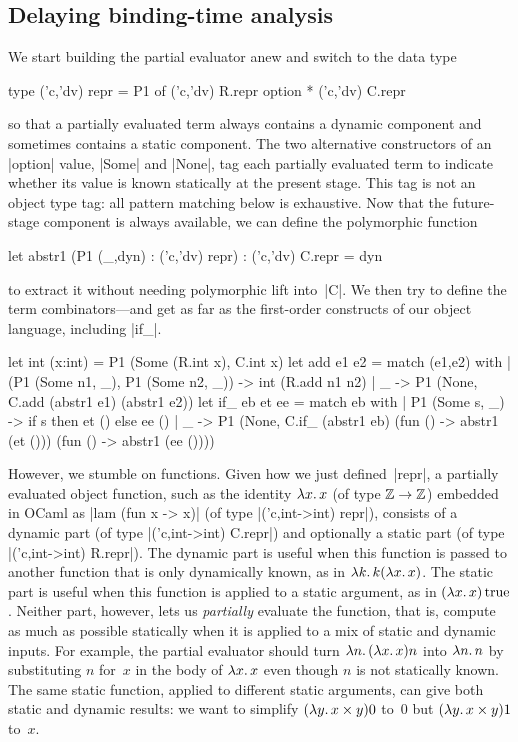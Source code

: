 \subsection{Delaying binding-time analysis}
\label{S:PE-problem}

We start building the partial evaluator anew and
switch to the data type
\begin{code}
type ('c,'dv) repr = P1 of ('c,'dv) R.repr option * ('c,'dv) C.repr
\end{code}
so that a partially evaluated term always contains a dynamic
component and sometimes contains a static component.
The two
alternative constructors of an |option| value, |Some| and |None|,
tag each partially evaluated term to indicate whether its value is
known statically at the present stage.
This tag is not an object type tag: all pattern matching below
is exhaustive. Now that the future-stage component is always available, we
can define the polymorphic function
\begin{code}
let abstr1 (P1 (_,dyn) : ('c,'dv) repr) : ('c,'dv) C.repr = dyn
\end{code}
to extract it without needing polymorphic lift into~|C|.  We then try
to define the term combinators\nobreak\hspace{0pt}---and get as far as
the first-order constructs of our object language, including |if_|.
\begin{code}
let int (x:int) = P1 (Some (R.int x), C.int x)
let add e1 e2 = match (e1,e2) with
  | (P1 (Some n1, _), P1 (Some n2, _)) -> int (R.add n1 n2)
  | _ -> P1 (None, C.add (abstr1 e1) (abstr1 e2))
let if_ eb et ee = match eb with
  | P1 (Some s, _) -> if s then et () else ee ()
  | _ -> P1 (None, C.if_ (abstr1 eb) (fun () -> abstr1 (et ()))
                                     (fun () -> abstr1 (ee ())))
\end{code}
However, we stumble on functions.  Given how we just
defined~|repr|, a partially evaluated object function, such as the
identity $\mathopen{\lambda\mathord{x}.\,}x$ (of type $\mathbb{Z}\to\mathbb{Z}$) embedded in OCaml as
|lam (fun x -> x)| (of type |('c,int->int) repr|), consists of
a dynamic part (of type |('c,int->int) C.repr|) and optionally
a static part (of type |('c,int->int) R.repr|).  The dynamic part is useful
when this function is passed to another function that is only
dynamically known, as in $\mathopen{\lambda\mathord{k}.\,}k(\mathopen{\lambda\mathord{x}.\,}x)$.  The static part is
useful when this function is applied to a static argument, as in
$(\mathopen{\lambda\mathord{x}.\,}x)\mathinner{\mathrm{true}}$.  Neither part, however, lets us \emph{partially}
evaluate the function, that is, compute as much as possible statically
when it is applied to a mix of static and dynamic inputs.  For example,
the partial evaluator should turn $\mathopen{\lambda\mathord{n}.\,}(\mathopen{\lambda\mathord{x}.\,}x)n$ into $\mathopen{\lambda\mathord{n}.\,}n$
by substituting $n$ for~$x$ in the body of $\mathopen{\lambda\mathord{x}.\,}x$ even though $n$ is
not statically known.  The same static function, applied to
different static arguments, can give both static and dynamic results: we
want to simplify $(\mathopen{\lambda\mathord{y}.\,}x\times y)0$ to~$0$ but $(\mathopen{\lambda\mathord{y}.\,}x\times y)1$
to~$x$.

